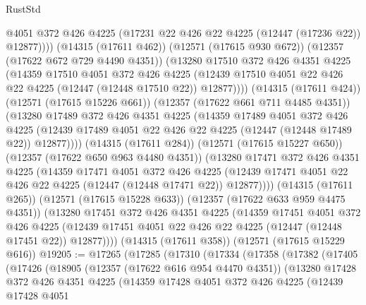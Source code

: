 \begin{lexlean}{RustStd}
\begin{coremodule}
                  @4051
                  @372
                  @426
                  @4225
                  (@17231 @22 @426 @22 @4225 (@12447 (@17236 @22)) @12877))))
            (@14315 (@17611 @462))
            (@12571 (@17615 @930 @672))
            (@12357 (@17622 @672 @729 @4490 @4351))
            (@13280
              @17510
              @372
              @426
              @4351
              @4225
              (@14359
                @17510
                @4051
                @372
                @426
                @4225
                (@12439 @17510 @4051 @22 @426 @22 @4225 (@12447 (@12448 @17510 @22)) @12877))))
          (@14315 (@17611 @424))
          (@12571 (@17615 @15226 @661))
          (@12357 (@17622 @661 @711 @4485 @4351))
          (@13280
            @17489
            @372
            @426
            @4351
            @4225
            (@14359
              @17489
              @4051
              @372
              @426
              @4225
              (@12439 @17489 @4051 @22 @426 @22 @4225 (@12447 (@12448 @17489 @22)) @12877))))
        (@14315 (@17611 @284))
        (@12571 (@17615 @15227 @650))
        (@12357 (@17622 @650 @963 @4480 @4351))
        (@13280
          @17471
          @372
          @426
          @4351
          @4225
          (@14359
            @17471
            @4051
            @372
            @426
            @4225
            (@12439 @17471 @4051 @22 @426 @22 @4225 (@12447 (@12448 @17471 @22)) @12877))))
      (@14315 (@17611 @265))
      (@12571 (@17615 @15228 @633))
      (@12357 (@17622 @633 @959 @4475 @4351))
      (@13280
        @17451
        @372
        @426
        @4351
        @4225
        (@14359
          @17451
          @4051
          @372
          @426
          @4225
          (@12439 @17451 @4051 @22 @426 @22 @4225 (@12447 (@12448 @17451 @22)) @12877))))
    (@14315 (@17611 @358))
    (@12571 (@17615 @15229 @616))
@19205 := @17265
    (@17285
      (@17310
        (@17334
          (@17358
            (@17382
              (@17405
                (@17426
                  (@18905
                    (@12357 (@17622 @616 @954 @4470 @4351))
                    (@13280
                      @17428
                      @372
                      @426
                      @4351
                      @4225
                      (@14359
                        @17428
                        @4051
                        @372
                        @426
                        @4225
                        (@12439
                          @17428
                          @4051

\end{coremodule}
\end{lexlean}
